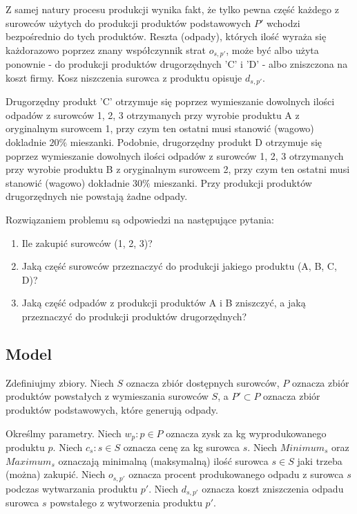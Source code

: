 \documentclass[a4paper,11pt]{article}
\theoremstyle{mytheor}
\begin{document}
Z samej natury procesu produkcji wynika fakt, że tylko pewna część każdego z surowców
użytych do produkcji produktów podstawowych $P'$ wchodzi bezpośrednio do tych produktów.
Reszta (odpady), których ilość wyraża się każdorazowo poprzez znany współczynnik strat
$o_{s, p'}$, może być albo użyta ponownie - do produkcji produktów drugorzędnych 'C' i 'D' -
albo zniszczona na koszt firmy. Kosz niszczenia surowca z produktu opisuje $d_{s,p'}$.

Drugorzędny produkt 'C' otrzymuje się poprzez wymieszanie dowolnych ilości odpadów z
surowców 1, 2, 3 otrzymanych przy wyrobie produktu A z oryginalnym surowcem 1, przy
czym ten ostatni musi stanowić (wagowo) dokladnie $20\%$ mieszanki. Podobnie, drugorzędny
produkt D otrzymuje się poprzez wymieszanie dowolnych ilości odpadów z surowców 1, 2,
3 otrzymanych przy wyrobie produktu B z oryginalnym surowcem 2, przy czym ten ostatni
musi stanowić (wagowo) dokładnie $30\%$ mieszanki. Przy produkcji produktów drugorzędnych
nie powstają żadne odpady.

Rozwiązaniem problemu są odpowiedzi na następujące pytania:
\begin{enumerate}
    \item Ile zakupić surowców (1, 2, 3)?
    \item Jaką część surowców przeznaczyć do produkcji jakiego produktu (A, B, C, D)?
    \item Jaką część odpadów z produkcji produktów A i B zniszczyć, a jaką przeznaczyć do
    produkcji produktów drugorzędnych?
\end{enumerate}

\subsection*{Model}
Zdefiniujmy zbiory. Niech $S$ oznacza zbiór dostępnych surowców, $P$ oznacza zbiór produktów powstałych z wymieszania surowców $S$, a $P'\subset P$ oznacza zbiór produktów podstawowych, które generują odpady.

Określmy parametry.
Niech $w_p: p\in P$ oznacza zysk za kg wyprodukowanego produktu $p$.
Niech $c_s: s\in S$ oznacza cenę za kg surowca $s$.
Niech $\textit{Minimum}_s$ oraz $\textit{Maximum}_s$ oznaczają minimalną (maksymalną) ilość surowca $s\in S$ jaki trzeba (można) zakupić.
Niech $o_{s, p'}$ oznacza procent produkowanego odpadu z surowca $s$ podczas wytwarzania produktu $p'$.
Niech $d_{s, p'}$ oznacza koszt zniszczenia odpadu surowca $s$ powstałego z wytworzenia produktu $p'$.
\end{document}
